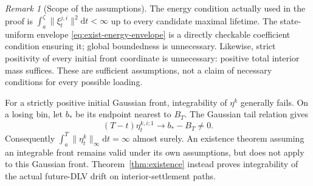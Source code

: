 \documentclass[11pt]{article}
\newcommand{\dd}{\mathrm d}
\theoremstyle{plain}
\theoremstyle{definition}
\theoremstyle{remark}
\newtheorem{remark}[theorem]{Remark}
\begin{document}
\begin{remark}[Scope of the assumptions]\label{rem:exist-assumptions}
The energy condition actually used in the proof is
$\int_a^\zeta\lVert\xi_t^{j,i}\rVert^2\dd t<\infty$ up to every
candidate maximal lifetime. The state-uniform envelope
\eqref{eq:exist-energy-envelope} is a directly checkable coefficient
condition ensuring it; global boundedness is unnecessary. Likewise,
strict positivity of every initial front coordinate is unnecessary:
positive total interior mass suffices. These are sufficient assumptions,
not a claim of necessary conditions for every possible loading.

For a strictly positive initial Gaussian front, integrability of
$\eta^k$ generally fails. On a losing bin, let $b_*$ be its endpoint
nearest to $B_T$. The Gaussian tail relation gives
\[
 (T-t)\eta_t^{k,i;1}\longrightarrow b_*-B_T\ne0.
\]
Consequently $\int_a^T\lVert\eta_t^k\rVert_\infty\dd t=\infty$
almost surely. An existence theorem assuming an integrable front remains
valid under its own assumptions, but does not apply to this Gaussian
front. Theorem~\ref{thm:existence} instead proves integrability of the
actual future-DLV drift on interior-settlement paths.
\end{remark}
\end{document}
